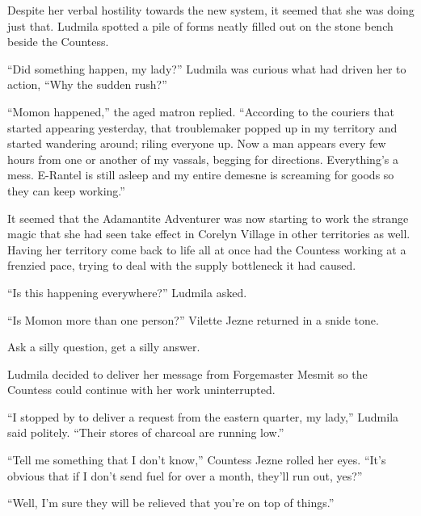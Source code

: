  

Despite her verbal hostility towards the new system, it seemed that she was doing just that. Ludmila spotted a pile of forms neatly filled out on the stone bench beside the Countess.

 

“Did something happen, my lady?” Ludmila was curious what had driven her to action, “Why the sudden rush?”

 

“Momon happened,” the aged matron replied. “According to the couriers that started appearing yesterday, that troublemaker popped up in my territory and started wandering around; riling everyone up. Now a man appears every few hours from one or another of my vassals, begging for directions. Everything's a mess. E-Rantel is still asleep and my entire demesne is screaming for goods so they can keep working.”

 

It seemed that the Adamantite Adventurer was now starting to work the strange magic that she had seen take effect in Corelyn Village in other territories as well. Having her territory come back to life all at once had the Countess working at a frenzied pace, trying to deal with the supply bottleneck it had caused.

 

“Is this happening everywhere?” Ludmila asked.

 

“Is Momon more than one person?” Vilette Jezne returned in a snide tone.

 

Ask a silly question, get a silly answer.

 

Ludmila decided to deliver her message from Forgemaster Mesmit so the Countess could continue with her work uninterrupted.

 

“I stopped by to deliver a request from the eastern quarter, my lady,” Ludmila said politely. “Their stores of charcoal are running low.”

 

“Tell me something that I don’t know,” Countess Jezne rolled her eyes. “It’s obvious that if I don’t send fuel for over a month, they’ll run out, yes?”

 

“Well, I’m sure they will be relieved that you’re on top of things.”

 

